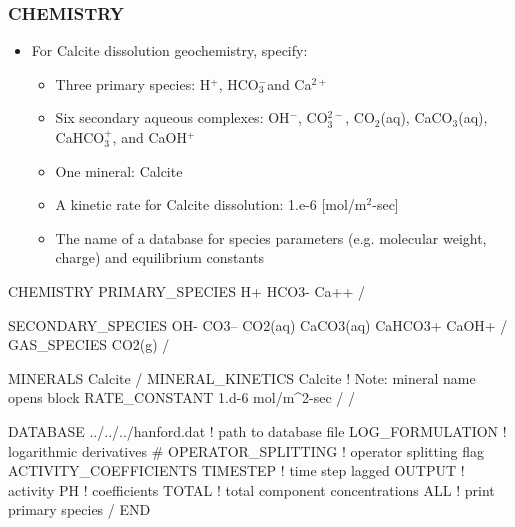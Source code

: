 \documentclass{beamer}
\def\calcium{Ca$^{2+}$}
\def\hion{H$^+$}
\def\hydroxide{OH$^-$}
\def\bicarbonate{HCO$_3^-$}
\def\carbonate{CO$_3^{2-}$}
\def\cotwo{CO$_2$(aq)}
\newcommand\bluecomment[1]{{{\color{blue} #1}}}
\begin{document}
\begin{frame}\frametitle{CHEMISTRY}

\begin{itemize}
\item For Calcite dissolution geochemistry, specify:
  \begin{itemize}
    \item Three primary species: \hion, \bicarbonate and \calcium
    \item Six secondary aqueous complexes: \hydroxide, \carbonate, \cotwo, CaCO$_3$(aq), CaHCO$_3^+$, and CaOH$^+$
    \item One mineral: Calcite
    \item A kinetic rate for Calcite dissolution: 1.e-6 [mol/m$^2$-sec]
    \item The name of a database for species parameters (e.g. molecular weight, charge) and equilibrium constants
  \end{itemize}
\end{itemize}

\begin{semiverbatim}
CHEMISTRY
  PRIMARY_SPECIES
    H+
    HCO3-
    Ca++
  /
\end{semiverbatim}
\newpage

\begin{semiverbatim}


  SECONDARY_SPECIES
    OH-
    CO3--
    CO2(aq)
    CaCO3(aq)
    CaHCO3+
    CaOH+
  /
  GAS_SPECIES
    CO2(g)
  /
\end{semiverbatim}
\newpage

\begin{semiverbatim}


  MINERALS
    Calcite
  /
  MINERAL_KINETICS
    Calcite       \bluecomment{! Note: mineral name opens block}
      RATE_CONSTANT 1.d-6 mol/m^2-sec
    /
  /
\end{semiverbatim}
\newpage

\begin{semiverbatim}


  DATABASE ../../../hanford.dat  \bluecomment{! path to database file}
  LOG_FORMULATION         \bluecomment{! logarithmic derivatives}
#  OPERATOR_SPLITTING     \bluecomment{! operator splitting flag}
  ACTIVITY_COEFFICIENTS TIMESTEP  \bluecomment{! time step lagged}
  OUTPUT                          \bluecomment{!   activity}
    PH                            \bluecomment{!   coefficients}
    TOTAL     \bluecomment{! total component concentrations}
    ALL       \bluecomment{! print primary species}
  /
END

\end{semiverbatim}

\end{frame}
\end{document}
